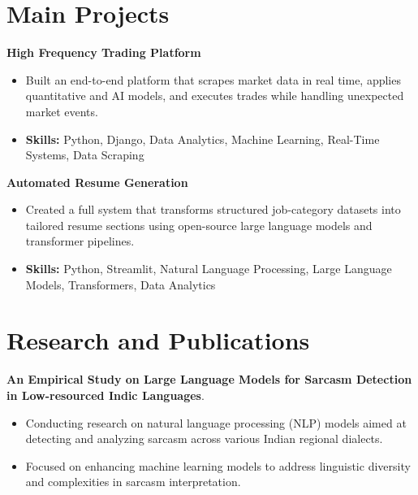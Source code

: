 \documentclass[a4paper,11pt]{article}
\begin{document}
\section{\textbf{Main Projects}}

\vspace{1mm}
  \textbf{High Frequency Trading Platform  }
\vspace{-1.5mm} %
\begin{itemize}
  \item Built an end-to-end platform that scrapes market data in real time, applies quantitative and AI models, and executes trades while handling unexpected market events.
\vspace{-3mm}
  \item \textbf{Skills:} Python, Django, Data Analytics, Machine Learning, Real-Time Systems, Data Scraping
\end{itemize}


\vspace{1mm}
   \textbf{Automated Resume Generation }
\vspace{-1.5mm} %
\begin{itemize}
  \item Created a full system that transforms structured job-category datasets into tailored resume sections using open-source large language models and transformer pipelines.
\vspace{-3mm}
  \item \textbf{Skills:} Python, Streamlit, Natural Language Processing, Large Language Models, Transformers, Data Analytics
\end{itemize}



\section{\textbf{Research and Publications} \hfill }
\vspace{1mm}
  \textbf{An Empirical Study on Large Language Models for Sarcasm Detection in Low-resourced Indic Languages}.
\vspace{-1mm} %
\begin{itemize}
  \item Conducting research on natural language processing (NLP) models aimed at detecting and analyzing sarcasm across various Indian regional dialects.
\vspace{-3mm}
  \item Focused on enhancing machine learning models to address linguistic diversity and complexities in sarcasm interpretation.
\end{itemize}
\end{document}
